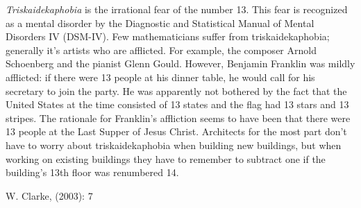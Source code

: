 \documentclass[12pt]{article}
\begin{document}

\emph{Triskaidekaphobia} is the irrational fear of the number 13. This fear is recognized as a mental disorder by the Diagnostic and Statistical Manual of Mental Disorders IV (DSM-IV). Few mathematicians suffer from triskaidekaphobia; generally it's artists who are afflicted. For example, the composer Arnold Schoenberg and the pianist Glenn Gould. However, Benjamin Franklin was mildly afflicted: if there were 13 people at his dinner table, he would call for his secretary to join the party. He was apparently not bothered by the fact that the United States at the time consisted of 13 states and the flag had 13 stars and 13 stripes. The rationale for Franklin's affliction seems to have been that there were 13 people at the Last Supper of Jesus Christ. Architects for the most part don't have to worry about triskaidekaphobia when building new  buildings, but when working on existing buildings they have to remember to subtract one if the building's 13th floor was renumbered 14.

\begin{thebibliography}{1}
 W. Clarke,  (2003): 7
\end{thebibliography}
\end{document}
